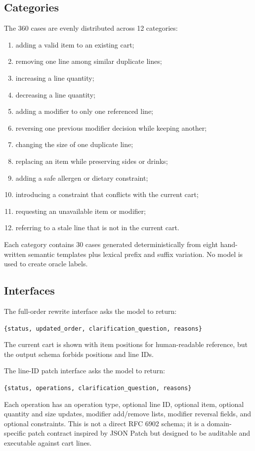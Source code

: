 \documentclass[11pt]{article}
\begin{document}
\subsection{Categories}
The 360 cases are evenly distributed across 12 categories:
\begin{enumerate}[leftmargin=*]
  \item adding a valid item to an existing cart;
  \item removing one line among similar duplicate lines;
  \item increasing a line quantity;
  \item decreasing a line quantity;
  \item adding a modifier to only one referenced line;
  \item reversing one previous modifier decision while keeping another;
  \item changing the size of one duplicate line;
  \item replacing an item while preserving sides or drinks;
  \item adding a safe allergen or dietary constraint;
  \item introducing a constraint that conflicts with the current cart;
  \item requesting an unavailable item or modifier;
  \item referring to a stale line that is not in the current cart.
\end{enumerate}
Each category contains 30 cases generated deterministically from eight
hand-written semantic templates plus lexical prefix and suffix variation. No
model is used to create oracle labels.

\subsection{Interfaces}
The full-order rewrite interface asks the model to return:
\begin{center}
\small
\texttt{\{status, updated\_order, clarification\_question, reasons\}}
\end{center}
The current cart is shown with item positions for human-readable reference, but
the output schema forbids positions and line IDs.

The line-ID patch interface asks the model to return:
\begin{center}
\small
\texttt{\{status, operations, clarification\_question, reasons\}}
\end{center}
Each operation has an operation type, optional line ID, optional item, optional
quantity and size updates, modifier add/remove lists, modifier reversal fields,
and optional constraints. This is not a direct RFC 6902 schema; it is a
domain-specific patch contract inspired by JSON Patch but designed to be
auditable and executable against cart lines.
\end{document}
